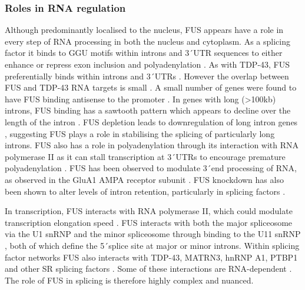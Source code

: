 \subsubsection{Roles in RNA regulation}

Although predominantly localised to the nucleus, FUS appears have a role in every step of RNA processing in both the nucleus and cytoplasm. 
As a splicing factor it binds to GGU motifs within introns and 3\'\ UTR sequences to either enhance or repress exon inclusion and polyadenylation \citep{Rogelj2012,Lagier-Tourenne2012}.
As with TDP-43, FUS preferentially binds within introns and 3\'\ UTRs \citep{Lagier-Tourenne2012,Rogelj2012,Ishigaki2012}. 
However the overlap between FUS and TDP-43 RNA targets is small  \citep{Lagier-Tourenne2012,Rogelj2012,Colombrita2012, Honda2014}.
A small number of genes were found to have FUS binding antisense to the promoter \citep{Ishigaki2012}.
In genes with long (>100kb) introns, FUS binding has a sawtooth pattern which appears to decline over the length of the intron \citep{Rogelj2012}. 
FUS depletion leads to downregulation of long intron genes \citep{Lagier-Tourenne2012}, suggesting FUS plays a role in stabilising the splicing of particularly long introns.
FUS also has a role in polyadenylation through its interaction with RNA polymerase II \citep{Schwartz2012} as it can stall transcription at 3\'\ UTRs to encourage premature polyadenylation \citep{Masuda2015}. 
FUS has been observed to modulate 3\'\ end processing of RNA, as observed in the GluA1 AMPA receptor subunit \citep{Udagawa2015}. %
FUS knockdown has also been shown to alter levels of intron retention, particularly in splicing factors \citep{VanBlitterswijk2013, Nakaya2013}.

In transcription, FUS interacts with RNA polymerase II, which could modulate transcription elongation speed \citep{Schwartz2012}.
FUS interacts with both the major spliceosome via the U1 snRNP \citep{Sun2015a, Yu2015a} and the minor spliceosome through binding to  the U11 snRNP \citep{Reber2016}, both of which define the 5\'\ splice site at major or minor introns.
Within splicing factor networks FUS also interacts with TDP-43, MATRN3, hnRNP A1, PTBP1 and other SR splicing factors \citep{Lagier-Tourenne2012,Yamaguchi2016,Yang1998,Meissner2003, Kamelgarn2016}. 
Some of these interactions are RNA-dependent \citep{Kamelgarn2016}.
The role of FUS in splicing is therefore highly complex and nuanced.

